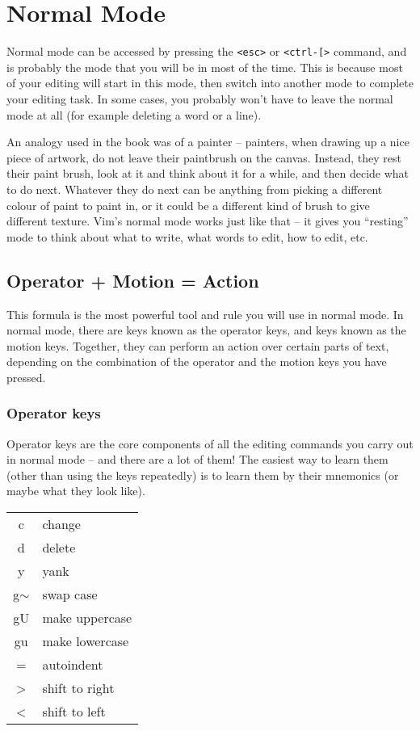 \section{Normal Mode}

Normal mode can be accessed by pressing  the \verb|<esc>| or \verb|<ctrl-[>| command, and is probably the mode that you will be in most of the time.
This is because most of your editing will start in this mode, then switch into another mode to complete your editing task.
In some cases, you probably won't have to leave the normal mode at all (for example deleting a word or a line).

An analogy used in the book was of a painter -- painters, when drawing up a nice piece of artwork, do not leave their paintbrush on the canvas.
Instead, they rest their paint brush, look at it and think about it for a while, and then decide what to do next.
Whatever they do next can be anything from picking a different colour of paint to paint in, or it could be a different kind of brush to give different texture.
Vim's normal mode works just like that -- it gives you ``resting'' mode to think about what to write, what words to edit, how to edit, etc.

\subsection{Operator + Motion = Action}

This formula is the most powerful tool and rule you will use in normal mode.
In normal mode, there are keys known as the operator keys, and keys known as the motion keys.
Together, they can perform an action over certain parts of text, depending on the combination of the operator and the motion keys you have pressed.

\subsubsection{Operator keys}

Operator keys are the core components of all the editing commands you carry out in normal mode -- and there are a lot of them!
The easiest way to learn them (other than using the keys repeatedly) is to learn them by their mnemonics (or maybe what they look like).
\newline

\begin{tabular}[c]{c|l}
    c            & change\\
    d            & delete\\
    y            & yank\\
    g$\sim$      & swap case\\
    gU           & make uppercase\\
    gu           & make lowercase\\
    =            & autoindent\\
    \textgreater & shift to right\\
    \textless    & shift to left\\
\end{tabular}
\newline

